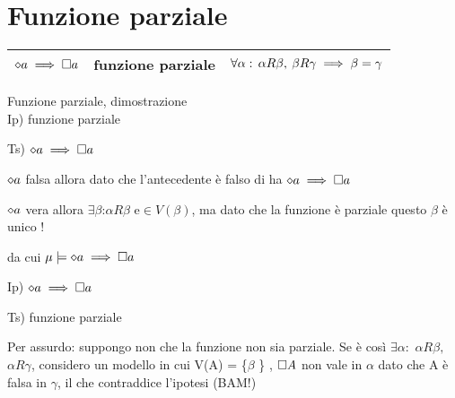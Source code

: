 \begin{center} 
\end{center}




\section{Funzione parziale}

\begin{tabular}{|c|c|c|}
\hline 
$\diamond a\implies\square a$  & funzione parziale  & $\forall\alpha:\,\alpha R\beta,\:\beta R\gamma\implies\beta=\gamma$\tabularnewline
\hline 
\end{tabular}

Funzione parziale, dimostrazione\\


Ip) funzione parziale

Ts) $\diamond a\implies\square a$ 

$\diamond a$ falsa allora dato che l'antecedente è falso di ha $\diamond a\implies\square a$

$\diamond a$ vera allora $\exists\beta$:$\alpha R\beta$ e$\in V(\beta)$,
ma dato che la funzione è parziale questo $\beta$ è unico !

da cui $\mu\models\diamond a\implies\square a$

Ip) $\diamond a\implies\square a$ 

Ts) funzione parziale

Per assurdo: suppongo non che la funzione non sia parziale. Se è così
$\exists\alpha:$ $\alpha R\beta,$ $\alpha R\gamma$, considero un
modello in cui V(A) = \{$\beta$ \} , $\square A$ non vale in $\alpha$
dato che A è falsa in $\gamma$, il che contraddice l'ipotesi (BAM!)\\
 \\
 


